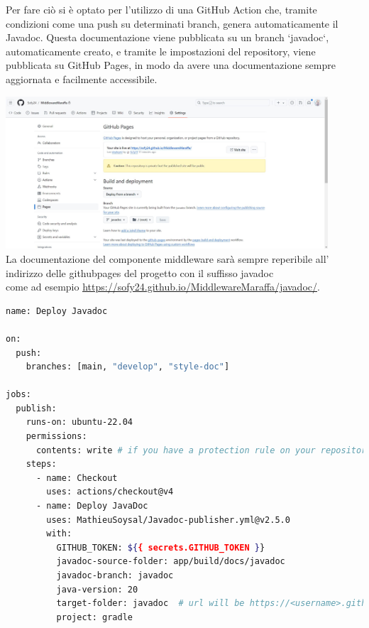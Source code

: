 Per fare ciò si è optato per l'utilizzo di una GitHub Action che, tramite condizioni come una push su determinati branch, genera automaticamente il Javadoc. Questa documentazione viene pubblicata su un branch `javadoc`, automaticamente creato, e tramite le impostazioni del repository, viene pubblicata su GitHub Pages, in modo da avere una documentazione sempre aggiornata e facilmente accessibile.

\includegraphics[width=12cm]{report/img/github_javadoc.jpg}\\[1.5cm]

La documentazione del componente middleware sarà sempre reperibile
all' indirizzo delle githubpages del progetto con il suffisso javadoc \\ come ad esempio \href{https://sofy24.github.io/MiddlewareMaraffa/javadoc/}{\underline{https://sofy24.github.io/MiddlewareMaraffa/javadoc/}}.

\begin{lstlisting}[language=Bash, caption={Configurazione della GitHub Action per il Javadoc}, label=list:javadoc_action]
name: Deploy Javadoc

on:
  push:
    branches: [main, "develop", "style-doc"]

jobs:
  publish:
    runs-on: ubuntu-22.04
    permissions:
      contents: write # if you have a protection rule on your repository, you'll need to give write permission to the workflow.
    steps:
      - name: Checkout
        uses: actions/checkout@v4
      - name: Deploy JavaDoc
        uses: MathieuSoysal/Javadoc-publisher.yml@v2.5.0
        with:
          GITHUB_TOKEN: ${{ secrets.GITHUB_TOKEN }}
          javadoc-source-folder: app/build/docs/javadoc
          javadoc-branch: javadoc
          java-version: 20
          target-folder: javadoc  # url will be https://<username>.github.io/<repo>/javadoc, This can be left as nothing to generate javadocs in the root folder.
          project: gradle
\end{lstlisting}

